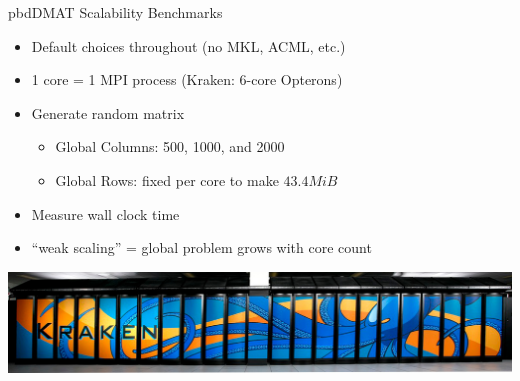 \begin{frame}
  \begin{block}{pbdDMAT Scalability Benchmarks}
    \begin{itemize}[<+-|alert@+>]
      \item Default choices throughout (no MKL, ACML, etc.)
      \item 1 core = 1 MPI process (Kraken: 6-core Opterons)
      \item Generate random matrix
        \begin{itemize}
        \item Global Columns: 500, 1000, and 2000
        \item Global Rows: fixed per core to make $43.4 MiB$
        \end{itemize}
      \item Measure wall clock time
      \item ``weak scaling'' = global problem grows with core count
    \end{itemize}
    \vspace{.8cm}
    \centering\includegraphics{../common/pics/krakenWide}
  \end{block}
\end{frame}


